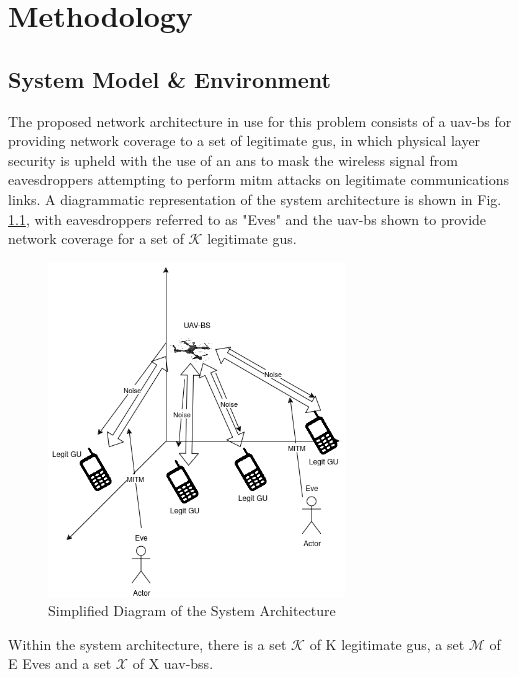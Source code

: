 \chapter{Methodology}
\section{System Model \& Environment}
The proposed network architecture in use for this problem consists of a \acrshort{uav}-\acrshort{bs} for providing network coverage to a set of legitimate \acrshort{gu}s, in which physical layer security is upheld with the use of an \acrshort{ans} to mask the wireless signal from eavesdroppers attempting to perform \acrshort{mitm} attacks on legitimate communications links. 
A diagrammatic representation of the system architecture is shown in Fig. \ref{fig:mengsc_simplified_architecture}, with eavesdroppers referred to as "Eves" and the \acrshort{uav}-\acrshort{bs} shown to provide network coverage for a set of $\mathcal{K}$ legitimate \acrshort{gu}s.
\begin{figure}[ht!]
    \centering
    \includegraphics[width=0.7\textwidth]{figures/MEngSc_Thesis_system_architecture_updated.drawio.png}
    \caption{Simplified Diagram of the System Architecture}
    \label{fig:mengsc_simplified_architecture}
\end{figure}

Within the system architecture, there is a set $\mathcal{K}$ of K legitimate \acrshort{gu}s, a set $\mathcal{M}$ of E Eves and a set $\mathcal{X}$ of X \acrshort{uav}-\acrshort{bs}s. 
